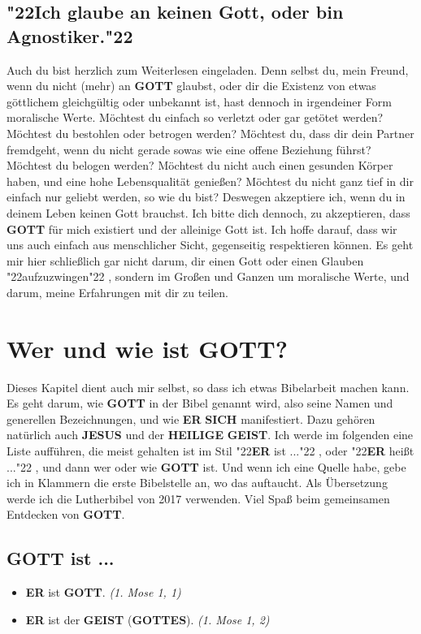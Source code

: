 \documentclass[10pt,a5paper]{article}
\newcommand{\Er}[0]{\textbf{ER}}
\newcommand{\Geist}[0]{\textbf{GEIST}}
\newcommand{\Gottes}[0]{\textbf{GOTTES}}
\newcommand{\Gott}[0]{\textbf{GOTT}}
\newcommand{\Heilige}[0]{\textbf{HEILIGE}}
\newcommand{\Jesus}[0]{\textbf{JESUS}}
\newcommand{\Sich}[0]{\textbf{SICH}}
\newcommand{\q}[1]{\char"22{#1}\char"22 }
\begin{document}
	\subsection{\q{Ich glaube an keinen Gott, oder bin Agnostiker.}}
		Auch du bist herzlich zum Weiterlesen eingeladen.
		Denn selbst du,
		mein Freund,
		wenn du nicht (mehr) an {\Gott} glaubst,
		oder dir die Existenz von etwas g\"ottlichem gleichg\"ultig oder unbekannt ist,
		hast dennoch in irgendeiner Form moralische Werte.
		M\"ochtest du einfach so verletzt oder gar get\"otet werden?
		M\"ochtest du bestohlen oder betrogen werden?
		M\"ochtest du,
		dass dir dein Partner fremdgeht,
		wenn du nicht gerade sowas wie eine offene Beziehung f\"uhrst?
		M\"ochtest du belogen werden?
		M\"ochtest du nicht auch einen gesunden K\"orper haben,
		und eine hohe Lebensqualit\"at genie{\ss}en?
		M\"ochtest du nicht ganz tief in dir einfach nur geliebt werden,
		so wie du bist?
		Deswegen akzeptiere ich,
		wenn du in deinem Leben keinen Gott brauchst.
		Ich bitte dich dennoch,
		zu akzeptieren,
		dass {\Gott} f\"ur mich existiert und der alleinige Gott ist.
		Ich hoffe darauf,
		dass wir uns auch einfach aus menschlicher Sicht,
		gegenseitig respektieren k\"onnen.
		Es geht mir hier schlie{\ss}lich gar nicht darum,
		dir einen Gott oder einen Glauben \q{aufzuzwingen},
		sondern im Gro{\ss}en und Ganzen um moralische Werte,
		und darum,
		meine Erfahrungen mit dir zu teilen.

	\newpage
	\section{Wer und wie ist {\Gott}?}
		Dieses Kapitel dient auch mir selbst,
		so dass ich etwas Bibelarbeit machen kann.
		Es geht darum,
		wie {\Gott} in der Bibel genannt wird,
		also seine Namen und generellen Bezeichnungen,
		und wie {\Er} {\Sich} manifestiert.
		Dazu geh\"oren nat\"urlich auch {\Jesus} und der {\Heilige} {\Geist}.
		Ich werde im folgenden eine Liste auff\"uhren,
		die meist gehalten ist im Stil \q{{\Er} ist ...},
		oder \q{{\Er} hei{\ss}t ...},
		und dann wer oder wie {\Gott} ist.
		Und wenn ich eine Quelle habe,
		gebe ich in Klammern die erste Bibelstelle an,
		wo das auftaucht.
		Als \"Ubersetzung werde ich die Lutherbibel von 2017 verwenden.
		Viel Spa{\ss} beim gemeinsamen Entdecken von {\Gott}.
	
	\subsection{{\Gott} ist ...}
		\begin{itemize}[nosep]
			\item {\Er} ist {\Gott}. \textit{(1. Mose 1, 1)}
			\item {\Er} ist der {\Geist} ({\Gottes}). \textit{(1. Mose 1, 2)}
		\end{itemize}
		
\end{document}
